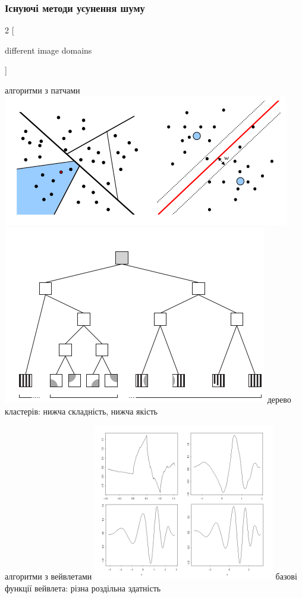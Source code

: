 \documentclass[12pt]{beamer}
\begin{document}
\begin{frame}\frametitle{Існуючі методи усунення шуму}	
	\begin{multicols}{2}
		[
		\begin{center} different image domains \end{center}
		]
		
		алгоритми з патчами 
		\includegraphics[scale=0.25]{images/cluster} \linebreak
		\includegraphics[scale=0.2]{images/patch2} \linebreak
		дерево кластерів: нижча складність, нижча якість
		\columnbreak
		
		алгоритми з вейвлетами
		\includegraphics[scale=0.4]{images/waves} \linebreak
		базові функції вейвлета: різна роздільна здатність
	\end{multicols}
\end{frame}
\end{document}

